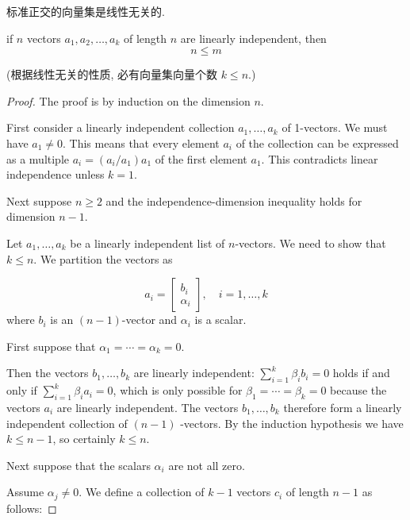 \begin{corollary}
    标准正交的向量集是线性无关的. 
\end{corollary}

\begin{theorem}
    if $ n $ vectors $ a_{1}, a_{2}, \ldots, a_{k} $ of length $ n $ are linearly independent, then
$$
n \leq m
$$

    (根据线性无关的性质, 必有向量集向量个数 $ k \leq n $.)
\end{theorem}

\begin{proof}
    The proof is by induction on the dimension $n$.

    First consider a linearly independent collection $ a_{1}, \ldots, a_{k} $ of 1-vectors. We must have $ a_{1} \neq 0 $. This means that every element $ a_{i} $ of the collection can be expressed as a multiple $ a_{i}=\left(a_{i} / a_{1}\right) a_{1} $ of the first element $ a_{1} $. This contradicts linear independence unless $ k=1 $.

    Next suppose $ n \geq 2 $ and the independence-dimension inequality holds for dimension $ n-1 $. 
    
    Let $ a_{1}, \ldots, a_{k} $ be a linearly independent list of $ n $-vectors. We need to show that $ k \leq n $. We partition the vectors as

    $$
    a_{i}=\left[\begin{array}{r}
    b_{i} \\
    \alpha_{i}
    \end{array}\right], \quad i=1, \ldots, k
    $$
    where $ b_{i} $ is an $ (n-1) $-vector and $ \alpha_{i} $ is a scalar.

    First suppose that $ \alpha_{1}=\cdots=\alpha_{k}=0 $. 
    
    Then the vectors $ b_{1}, \ldots, b_{k} $ are linearly independent: $ \sum_{i=1}^{k} \beta_{i} b_{i}=0 $ holds if and only if $ \sum_{i=1}^{k} \beta_{i} a_{i}=0 $, which is only possible for $ \beta_{1}=\cdots=\beta_{k}=0 $ because the vectors $ a_{i} $ are linearly independent. The vectors $ b_{1}, \ldots, b_{k} $ therefore form a linearly independent collection of $ (n-1) $ -vectors. By the induction hypothesis we have $ k \leq n-1 $, so certainly $ k \leq n $.

    Next suppose that the scalars $ \alpha_{i} $ are not all zero.
    
    Assume $ \alpha_{j} \neq 0 . $ We define a collection of $ k-1 $ vectors $ c_{i} $ of length $ n-1 $ as follows:


\end{proof}
